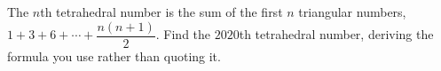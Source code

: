 The $n$th tetrahedral number is the sum of the first $n$ triangular numbers, $1+3+6+\cdots+\dfrac{n(n+1)}2$. Find the $2020$th tetrahedral number, deriving the formula you use rather than quoting it.
